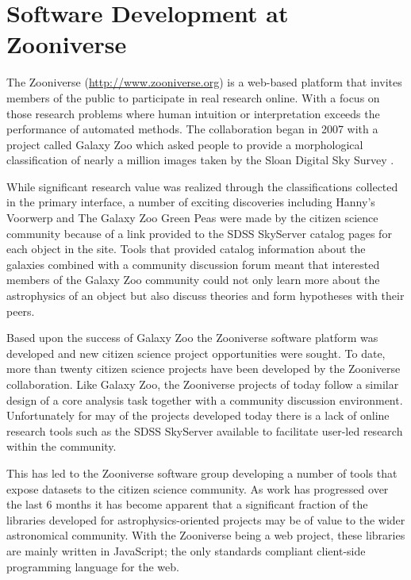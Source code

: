 \section{Software Development at Zooniverse}


The Zooniverse (\url{http://www.zooniverse.org}) is a web-based platform that invites members of the public to participate in real research online. With a focus on those research problems where human intuition or interpretation exceeds the performance of automated methods. The collaboration began in 2007 with a project called Galaxy Zoo \citep{2007AAS...211.9403R} which asked people to provide a morphological classification of nearly a million images taken by the Sloan Digital Sky Survey \citep{2000AJ....120.1579Y}.

While significant research value was realized through the classifications collected in the primary interface, a number of exciting discoveries including Hanny's Voorwerp \citep{2009MNRAS.399..129L} and The Galaxy Zoo Green Peas \citep{2009MNRAS.399.1191C} were made by the citizen science community because of a link provided to the SDSS SkyServer \citep{2002cs........2013S} catalog pages for each object in the site. Tools that provided catalog information about the galaxies combined with a community discussion forum meant that interested members of the Galaxy Zoo community could not only learn more about the astrophysics of an object but also discuss theories and form hypotheses with their peers.

Based upon the success of Galaxy Zoo the Zooniverse software platform was developed and new citizen science project opportunities were sought. To date, more than twenty citizen science projects have been developed by the Zooniverse collaboration. Like Galaxy Zoo, the Zooniverse projects of today follow a similar design of a core analysis task together with a community discussion environment. Unfortunately for may of the projects developed today there is a lack of online research tools such as the SDSS SkyServer available to facilitate user-led research within the community.

This has led to the Zooniverse software group developing a number of tools that expose datasets to the citizen science community. As work has progressed over the last 6 months it has become apparent that a significant fraction of the libraries developed for astrophysics-oriented projects may be of value to the wider astronomical community. With the Zooniverse being a web project, these libraries are mainly written in JavaScript; the only standards compliant client-side programming language for the web.

